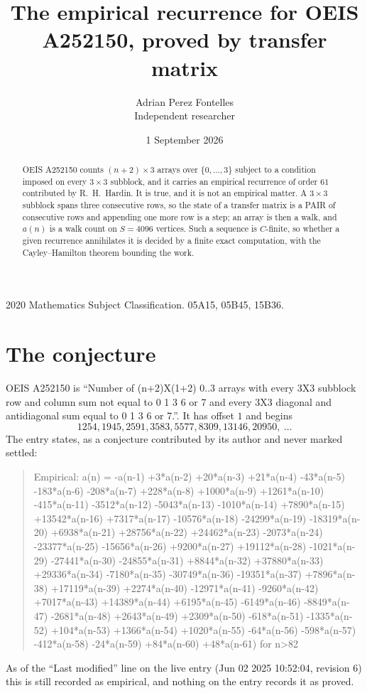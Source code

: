 \documentclass[11pt,a4paper]{article}
\title{The empirical recurrence for OEIS A252150, proved by transfer matrix}
\author{Adrian Perez Fontelles\\ \small Independent researcher}
\date{1 September 2026}
\theoremstyle{plain}
\theoremstyle{definition}
\begin{document}
\maketitle

\begin{abstract}
OEIS A252150 counts $(n+2)\times3$ arrays over $\{0,\dots,3\}$ subject to a condition imposed on
every $3\times3$ subblock, and it carries an empirical recurrence of order $61$
contributed by R.~H.~Hardin. It is true, and it is not an empirical matter. A $3\times3$
subblock spans three consecutive rows, so the state of a transfer matrix is a PAIR of
consecutive rows and appending one more row is a step; an array is then a walk, and
$a(n)$ is a walk count on $S=4096$ vertices. Such a sequence is $C$-finite, so whether a given
recurrence annihilates it is decided by a finite exact computation, with the Cayley--Hamilton
theorem bounding the work.
\end{abstract}

\noindent\small 2020 Mathematics Subject Classification. 05A15, 05B45, 15B36.\normalsize

\section{The conjecture}

OEIS A252150 is ``Number of (n+2)X(1+2) 0..3 arrays with every 3X3 subblock row and column sum not equal to 0 1 3 6 or 7 and every 3X3 diagonal and antidiagonal sum equal to 0 1 3 6 or 7.''. It has offset $1$ and begins
\[
1254, 1945, 2591, 3583, 5577, 8309, 13146, 20950,\ \dots
\]
The entry states, as a conjecture contributed by its author and never marked settled:
\begin{quote}
Empirical: a(n) = -a(n-1) +3*a(n-2) +20*a(n-3) +21*a(n-4) -43*a(n-5) -183*a(n-6) -208*a(n-7) +228*a(n-8) +1000*a(n-9) +1261*a(n-10) -415*a(n-11) -3512*a(n-12) -5043*a(n-13) -1010*a(n-14) +7890*a(n-15) +13542*a(n-16) +7317*a(n-17) -10576*a(n-18) -24299*a(n-19) -18319*a(n-20) +6938*a(n-21) +28756*a(n-22) +24462*a(n-23) -2073*a(n-24) -23377*a(n-25) -15656*a(n-26) +9200*a(n-27) +19112*a(n-28) -1021*a(n-29) -27441*a(n-30) -24855*a(n-31) +8844*a(n-32) +37880*a(n-33) +29336*a(n-34) -7180*a(n-35) -30749*a(n-36) -19351*a(n-37) +7896*a(n-38) +17119*a(n-39) +2274*a(n-40) -12971*a(n-41) -9260*a(n-42) +7017*a(n-43) +14389*a(n-44) +6195*a(n-45) -6149*a(n-46) -8849*a(n-47) -2681*a(n-48) +2643*a(n-49) +2309*a(n-50) -618*a(n-51) -1335*a(n-52) +104*a(n-53) +1366*a(n-54) +1020*a(n-55) -64*a(n-56) -598*a(n-57) -412*a(n-58) -24*a(n-59) +84*a(n-60) +48*a(n-61) for n>82
\end{quote}
As of the ``Last modified'' line on the live entry (Jun 02 2025 10:52:04, revision 6) this is still
recorded as empirical, and nothing on the entry records it as proved.
\end{document}
